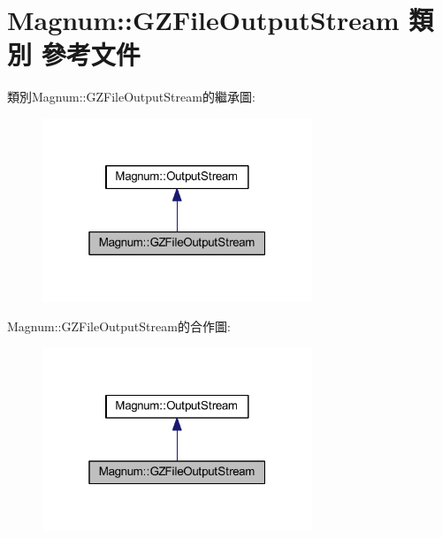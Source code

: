 \hypertarget{class_magnum_1_1_g_z_file_output_stream}{}\section{Magnum\+:\+:G\+Z\+File\+Output\+Stream 類別 參考文件}
\label{class_magnum_1_1_g_z_file_output_stream}


類別\+Magnum\+:\+:G\+Z\+File\+Output\+Stream的繼承圖\+:\nopagebreak
\begin{figure}[H]
\begin{center}
\leavevmode
\includegraphics[width=229pt]{class_magnum_1_1_g_z_file_output_stream__inherit__graph}
\end{center}
\end{figure}


Magnum\+:\+:G\+Z\+File\+Output\+Stream的合作圖\+:\nopagebreak
\begin{figure}[H]
\begin{center}
\leavevmode
\includegraphics[width=229pt]{class_magnum_1_1_g_z_file_output_stream__coll__graph}
\end{center}
\end{figure}
